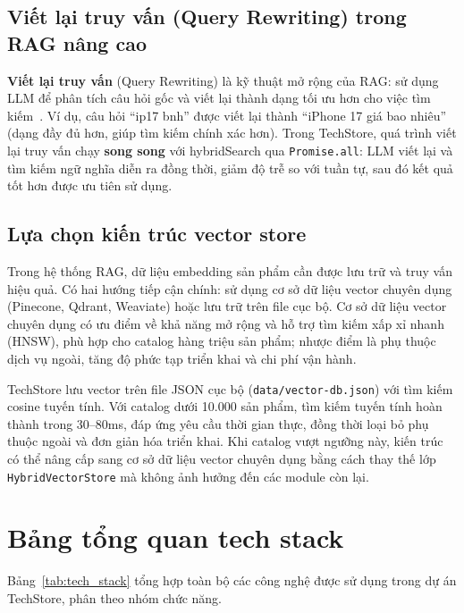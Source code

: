 \subsection{Viết lại truy vấn (Query Rewriting) trong RAG nâng cao}

\textbf{Viết lại truy vấn} (Query Rewriting) là kỹ thuật mở rộng của RAG: sử dụng LLM để phân tích câu hỏi gốc và viết lại thành dạng tối ưu hơn cho việc tìm kiếm~\cite{ma2023query}. Ví dụ, câu hỏi ``ip17 bnh'' được viết lại thành ``iPhone 17 giá bao nhiêu'' (dạng đầy đủ hơn, giúp tìm kiếm chính xác hơn). Trong TechStore, quá trình viết lại truy vấn chạy \textbf{song song} với hybridSearch qua \texttt{Promise.all}: LLM viết lại và tìm kiếm ngữ nghĩa diễn ra đồng thời, giảm độ trễ so với tuần tự, sau đó kết quả tốt hơn được ưu tiên sử dụng.

\subsection{Lựa chọn kiến trúc vector store}
\label{sec:c2_vector_store}

Trong hệ thống RAG, dữ liệu embedding sản phẩm cần được lưu trữ và truy vấn hiệu quả. Có hai hướng tiếp cận chính: sử dụng cơ sở dữ liệu vector chuyên dụng (Pinecone, Qdrant, Weaviate) hoặc lưu trữ trên file cục bộ. Cơ sở dữ liệu vector chuyên dụng có ưu điểm về khả năng mở rộng và hỗ trợ tìm kiếm xấp xỉ nhanh (HNSW), phù hợp cho catalog hàng triệu sản phẩm; nhược điểm là phụ thuộc dịch vụ ngoài, tăng độ phức tạp triển khai và chi phí vận hành.

TechStore lưu vector trên file JSON cục bộ (\texttt{data/vector-db.json}) với tìm kiếm cosine tuyến tính. Với catalog dưới 10.000 sản phẩm, tìm kiếm tuyến tính hoàn thành trong 30--80ms, đáp ứng yêu cầu thời gian thực, đồng thời loại bỏ phụ thuộc ngoài và đơn giản hóa triển khai. Khi catalog vượt ngưỡng này, kiến trúc có thể nâng cấp sang cơ sở dữ liệu vector chuyên dụng bằng cách thay thế lớp \texttt{HybridVectorStore} mà không ảnh hưởng đến các module còn lại.

\section{Bảng tổng quan tech stack}
\label{sec:c2_tech_summary}

Bảng~\ref{tab:tech_stack} tổng hợp toàn bộ các công nghệ được sử dụng trong dự án TechStore, phân theo nhóm chức năng.

